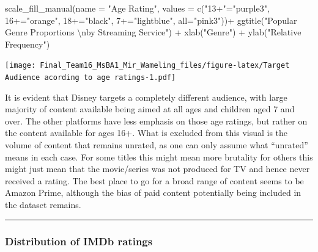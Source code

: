 \documentclass[
]{article}
\newenvironment{Shaded}{\begin{snugshade}}{\end{snugshade}}
\newcommand{\AttributeTok}[1]{\textcolor[rgb]{0.77,0.63,0.00}{#1}}
\newcommand{\FunctionTok}[1]{\textcolor[rgb]{0.00,0.00,0.00}{#1}}
\newcommand{\NormalTok}[1]{#1}
\newcommand{\OtherTok}[1]{\textcolor[rgb]{0.56,0.35,0.01}{#1}}
\newcommand{\SpecialCharTok}[1]{\textcolor[rgb]{0.00,0.00,0.00}{#1}}
\newcommand{\StringTok}[1]{\textcolor[rgb]{0.31,0.60,0.02}{#1}}
\begin{document}
\begin{Shaded}
\begin{Highlighting}[]
  \FunctionTok{scale\_fill\_manual}\NormalTok{(}\AttributeTok{name =} \StringTok{"Age Rating"}\NormalTok{,}
                    \AttributeTok{values =} \FunctionTok{c}\NormalTok{(}\StringTok{"13+"}\OtherTok{=}\StringTok{"purple3"}\NormalTok{, }
                               \StringTok{\textquotesingle{}16+\textquotesingle{}}\OtherTok{=}\StringTok{"orange"}\NormalTok{, }
                               \StringTok{\textquotesingle{}18+\textquotesingle{}}\OtherTok{=}\StringTok{"black"}\NormalTok{, }
                               \StringTok{\textquotesingle{}7+\textquotesingle{}}\OtherTok{=}\StringTok{"lightblue"}\NormalTok{, }
                               \StringTok{\textquotesingle{}all\textquotesingle{}}\OtherTok{=}\StringTok{"pink3"}\NormalTok{))}\SpecialCharTok{+}
  \FunctionTok{ggtitle}\NormalTok{(}\StringTok{"Popular Genre Proportions }\SpecialCharTok{\textbackslash{}n}\StringTok{by Streaming Service"}\NormalTok{) }\SpecialCharTok{+}
  \FunctionTok{xlab}\NormalTok{(}\StringTok{"Genre"}\NormalTok{) }\SpecialCharTok{+} 
  \FunctionTok{ylab}\NormalTok{(}\StringTok{"Relative Frequency"}\NormalTok{)}
\end{Highlighting}
\end{Shaded}

\texttt{[image: Final\_Team16\_MsBA1\_Mir\_Wameling\_files/figure-latex/Target Audience acording to age ratings-1.pdf]}

It is evident that Disney targets a completely different audience, with
large majority of content available being aimed at all ages and children
aged 7 and over. The other platforms have less emphasis on those age
ratings, but rather on the content available for ages 16+. What is
excluded from this visual is the volume of content that remains unrated,
as one can only assume what ``unrated'' means in each case. For some
titles this might mean more brutality for others this might just mean
that the movie/series was not produced for TV and hence never received a
rating. The best place to go for a broad range of content seems to be
Amazon Prime, although the bias of paid content potentially being
included in the dataset remains.

\begin{center}\rule{0.5\linewidth}{0.5pt}\end{center}

\hypertarget{distribution-of-imdb-ratings}{%
\subsubsection{Distribution of IMDb
ratings}\label{distribution-of-imdb-ratings}}
\end{document}
